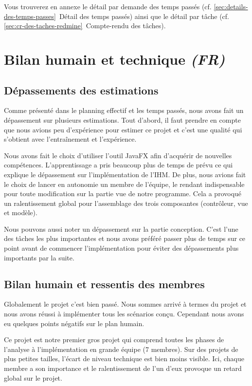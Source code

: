 \documentclass[paper=a4, fontsize=11pt]{report}
\numberwithin{equation}{section}		%
\numberwithin{figure}{section}		%
\numberwithin{table}{section}		%
\renewcommand{\it}[1]{\textit{#1}}
\begin{document}
Vous trouverez en annexe le détail par demande des temps passés (cf. \ref{sec:details-des-temps-passes}~Détail des temps passés) ainsi que le détail par tâche (cf. \ref{sec:cr-des-taches-redmine}~Compte-rendu des tâches).

\section{Bilan humain et technique \it{(FR)}}
\label{sec:bilan-humain-et-technique}

\subsection{Dépassements des estimations}
\label{subsec:depassements-des-estimations}

Comme présenté dans le planning effectif et les temps passés, nous avons fait un dépassement sur plusieurs estimations. Tout d'abord, il faut prendre en compte que nous avions peu d'expérience pour estimer ce projet et c'est une qualité qui s'obtient avec l’entraînement et l'expérience.

Nous avons fait le choix d'utiliser l'outil JavaFX afin d'acquérir de nouvelles compétences. L'apprentissage a pris beaucoup plus de temps de prévu ce qui explique le dépassement sur l'implémentation de l'IHM. De plus, nous avions fait le choix de lancer en autonomie un membre de l'équipe, le rendant indispensable pour toute modification sur la partie vue de notre programme. Cela a provoqué un ralentissement global pour l'assemblage des trois composantes (contrôleur, vue et modèle).

Nous pouvons aussi noter un dépassement sur la partie conception. C'est l'une des tâches les plus importantes et nous avons préféré passer plus de temps sur ce point avant de commencer l'implémentation pour éviter des dépassements plus importants par la suite.

\subsection{Bilan humain et ressentis des membres}
\label{subsec:bilan-humain}

Globalement le projet c'est bien passé. Nous sommes arrivé à termes du projet et nous avons réussi à implémenter tous les scénarios conçu. Cependant nous avons eu quelques points négatifs sur le plan humain.

Ce projet est notre premier gros projet qui comprend toutes les phases de l'analyse à l'implémentation en grande équipe (7 membres). Sur des projets de plus petites tailles, l'écart de niveau technique est bien moins visible. Ici, chaque membre a son importance et le ralentissement de l'un d'eux provoque un retard global sur le projet.
\end{document}

